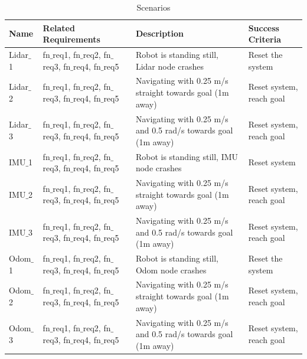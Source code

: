 \begin{table}[h!]
\caption{Scenarios}
	\begin{tabular}{| m{} | m{}| m{} | m{}|} 
  	\hline
  	Name & Related Requirements & Description & Success Criteria\\ 
  	\hline
  	Lidar$\_$1 & fn$\_$req1, fn$\_$req2, fn$\_$req3, fn$\_$req4, fn$\_$req5 & Robot is standing still, Lidar node crashes & Reset the system\\ 
  	\hline
  	Lidar$\_$2 & fn$\_$req1, fn$\_$req2, fn$\_$req3, fn$\_$req4, fn$\_$req5 & Navigating with 0.25 m/s straight towards goal (1m away) & Reset system, reach goal \\ 
  	\hline
  	Lidar$\_$3 & fn$\_$req1, fn$\_$req2, fn$\_$req3, fn$\_$req4, fn$\_$req5 & Navigating with 0.25 m/s and 0.5 rad/s towards goal (1m away) & Reset system, reach goal\\
  	\hline
  	IMU$\_$1 & fn$\_$req1, fn$\_$req2, fn$\_$req3, fn$\_$req4, fn$\_$req5 & Robot is standing still, IMU node crashes & Reset system \\
  	\hline
  	IMU$\_$2 & fn$\_$req1, fn$\_$req2, fn$\_$req3, fn$\_$req4, fn$\_$req5 & Navigating with 0.25 m/s straight towards goal (1m away) & Reset system, reach goal \\ 
  	\hline
  	IMU$\_$3 & fn$\_$req1, fn$\_$req2, fn$\_$req3, fn$\_$req4, fn$\_$req5 & Navigating with 0.25 m/s and 0.5 rad/s towards goal (1m away) & Reset system, reach goal\\
  	\hline
  	Odom$\_$1 & fn$\_$req1, fn$\_$req2, fn$\_$req3, fn$\_$req4, fn$\_$req5 & Robot is standing still, Odom node crashes & Reset the system\\ 
  	\hline
  	Odom$\_$2 & fn$\_$req1, fn$\_$req2, fn$\_$req3, fn$\_$req4, fn$\_$req5 & Navigating with 0.25 m/s straight towards goal (1m away) & Reset system, reach goal \\ 
  	\hline
  	Odom$\_$3 & fn$\_$req1, fn$\_$req2, fn$\_$req3, fn$\_$req4, fn$\_$req5 & Navigating with 0.25 m/s and 0.5 rad/s towards goal (1m away) & Reset system, reach goal\\
  	\hline
 	\end{tabular}
\end{table} 	
  	
